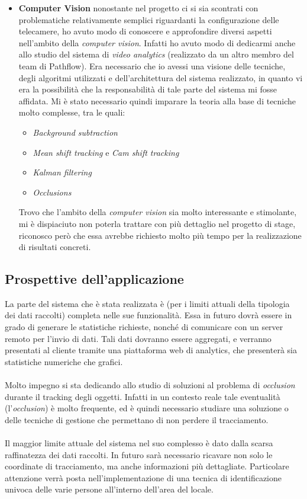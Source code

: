 \begin{itemize}
	\item \textbf{Computer Vision} nonostante nel progetto ci si sia scontrati con problematiche relativamente semplici riguardanti la configurazione delle telecamere, ho avuto modo di conoscere e approfondire diversi aspetti nell'ambito della \textit{computer vision}. Infatti ho avuto modo di dedicarmi anche allo studio del sistema di \textit{video analytics} (realizzato da un altro membro del team di Pathflow). Era necessario che io avessi una visione delle tecniche, degli algoritmi utilizzati e dell'architettura del sistema realizzato, in quanto vi era la possibilità che la responsabilità di tale parte del sistema mi fosse affidata. 
	Mi è stato necessario quindi imparare la teoria alla base di tecniche molto complesse, tra le quali:
	\begin{itemize}
		\item \textit{Background subtraction}
		\item \textit{Mean shift tracking} e \textit{Cam shift tracking}
		\item \textit{Kalman filtering}
		\item \textit{Occlusions}
	\end{itemize}
	Trovo che l'ambito della \textit{computer vision} sia molto interessante e stimolante, mi è dispiaciuto non poterla trattare con più dettaglio nel progetto di stage, riconosco però che essa avrebbe richiesto molto più tempo per la realizzazione di risultati concreti.
\end{itemize}

\subsection{Prospettive dell'applicazione}
La parte del sistema che è stata realizzata è (per i limiti attuali della tipologia dei dati raccolti) completa nelle sue funzionalità. Essa in futuro dovrà essere in grado di generare le statistiche richieste, nonché di comunicare con un server remoto per l'invio di dati. Tali dati dovranno essere aggregati, e verranno presentati al cliente tramite una piattaforma web di analytics, che presenterà sia statistiche numeriche che grafici. \\ \\
Molto impegno si sta dedicando allo studio di soluzioni al problema di \textit{occlusion} durante il tracking degli oggetti. Infatti in un contesto reale tale eventualità (l'\textit{occlusion}) è molto frequente, ed è quindi necessario studiare una soluzione o delle tecniche di gestione che permettano di non perdere il tracciamento.\\ \\
Il maggior limite attuale del sistema nel suo complesso è dato dalla scarsa raffinatezza dei dati raccolti. In futuro sarà necessario ricavare non solo le coordinate di tracciamento, ma anche informazioni più dettagliate. Particolare attenzione verrà posta nell'implementazione di una tecnica di identificazione univoca delle varie persone all'interno dell'area del locale. 



